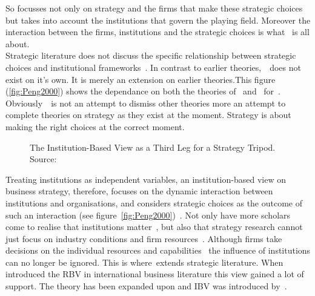 

So \ibv focusses not only on strategy and the firms that make these strategic choices but takes into account the institutions that govern the playing field. Moreover the interaction between the firms, institutions and the strategic choices is what \ibv~is all about.\\
Strategic literature does not discuss the specific relationship between strategic choices and institutional frameworks~\citep{Peng:2008us}.
In contrast to earlier theories,~\ibv~does not exist on it's own. It is merely an extension on earlier theories.This figure (\ref{fig:Peng2000}) shows the dependance on both the theories of~\cite{Barney:2001wq} and~\cite{Porter:1980to} for~\ibv. 
Obviously~\ibv~is not an attempt to dismiss other theories more an attempt to complete theories on strategy as they exist at the moment. 
Strategy is about making the right choices at the correct moment. 


%
\begin{figure}
\centering

\caption[The Institution-Based View as a Third Leg for a Strategy Tripod]{The Institution-Based View as a Third Leg for a Strategy Tripod. Source:~\citep{Peng:2009vt}}%
\label{fig:Peng2009} 
\end{figure}


Treating institutions as independent variables, an institution-based view on business strategy, therefore, focuses on the dynamic interaction between institutions and organisations, and considers strategic choices as the outcome of such an interaction (see figure~\ref{fig:Peng2000})~\citep{Peng:2002ef}.
Not only have more scholars come to realise that institutions matter~\citep{Powell:1991wn,Scott:2001tt}, but also that strategy research cannot just focus on industry conditions and firm resources~\citep{Khanna:1997wd}.
Although firms take decisions on the individual resources and capabilities~\cite{Barney:1991ur} the influence of institutions can no longer be ignored. This is where~\ibv extends strategic literature.
When introduced the \gls{RBV} in international business literature this view gained a lot of support. 
The theory has been expanded upon and \gls{IBV} was introduced by~\citep{Kostova:1999wt,Meyer:2009ue,Wang:2012ge}.